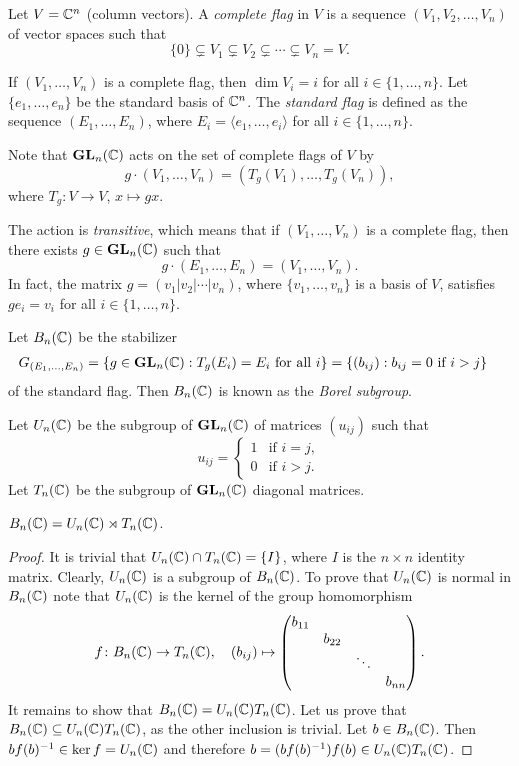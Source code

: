 \begin{definition}
    Let $V=\mathbb{C}^{n}$ (column vectors). A \emph{complete flag} in $V$ 
    is a sequence $(V_1,V_2,\dots,V_n)$ of vector spaces
    such that 
    \[
    \{0\}\subsetneq V_1\subsetneq V_2\subsetneq\cdots\subsetneq V_n=V.
    \]
\end{definition}

If $(V_1,\dots,V_n)$ is a complete flag, then $\dim V_i=i$ for all 
$i\in\{1,\dots,n\}$. 
Let $\{e_1,\dots,e_n\}$ be the standard basis of $\mathbb{C}^n$. 
The \emph{standard flag} is defined as the sequence $(E_1,\dots,E_n)$, where
$E_i=\langle e_1,\dots,e_i\rangle$ for all $i\in\{1,\dots,n\}$.  

Note that $\mathbf{GL}_n(\mathbb{C})$ acts on the set of complete flags of $V$ 
by 
\[
g\cdot (V_1,\dots,V_n)=(T_g(V_1),\dots,T_g(V_n)),
\]
where $T_g\colon V\to V$, $x\mapsto gx$. 

The action is \emph{transitive}, 
which means that if $(V_1,\dots,V_n)$ 
is a complete flag, then there exists 
$g\in\mathbf{GL}_n(\mathbb{C})$ such that 
\[
g\cdot (E_1,\dots,E_n)=(V_1,\dots,V_n).
\]
In fact, 
the matrix $g=(v_1|v_2|\cdots|v_n)$, where
$\{v_1,\dots,v_n\}$ is a basis of $V$, 
satisfies $ge_i=v_i$ for all $i\in\{1,\dots,n\}$. 

\label{Borel subgroup}
Let $B_n(\mathbb{C})$ be the stabilizer    
\begin{align*}
G_{(E_1,\dots,E_n)}
&=\{g\in\mathbf{GL}_n(\mathbb{C}):T_g(E_i)=E_i\text{ for all $i$}\}
=\{(b_{ij}):b_{ij}=0\text{ if $i>j$}\}
\end{align*}
of the standard flag. Then $B_n(\mathbb{C})$ is 
known as the \emph{Borel subgroup}. 

Let $U_n(\mathbb{C})$ be the subgroup of $\mathbf{GL}_n(\mathbb{C})$ 
of matrices $(u_{ij})$ such that 
\[
u_{ij}=\begin{cases}
1&\text{if $i=j$},\\
0&\text{if $i>j$}.\end{cases}
\]
Let $T_n(\mathbb{C})$ be the subgroup of $\mathbf{GL}_n(\mathbb{C})$ diagonal matrices. 

\begin{proposition}
    $B_n(\mathbb{C})=U_n(\mathbb{C})\rtimes T_n(\mathbb{C})$. 
\end{proposition}

\begin{proof}
    It is trivial that $U_n(\mathbb{C})\cap T_n(\mathbb{C})=\{I\}$, where $I$ is the 
    $n\times n$ identity matrix. Clearly, $U_n(\mathbb{C})$ is a subgroup of $B_n(\mathbb{C})$.
    To prove that 
    $U_n(\mathbb{C})$ is normal in $B_n(\mathbb{C})$ note that $U_n(\mathbb{C})$ is the kernel
    of the group homomorphism
    \[
    f\colon B_n(\mathbb{C})\to T_n(\mathbb{C}),\quad
    (b_{ij})\mapsto\begin{pmatrix}
        b_{11}\\
        &b_{22}\\
        &&\ddots\\
        &&&b_{nn}
    \end{pmatrix}.
    \]
    It remains to show that $B_n(\mathbb{C})=U_n(\mathbb{C})T_n(\mathbb{C})$.
    Let us prove that  $B_n(\mathbb{C})\subseteq U_n(\mathbb{C})T_n(\mathbb{C})$, as the other inclusion is trivial. 
    Let $b\in B_n(\mathbb{C})$. Then
    $bf(b)^{-1}\in \ker f=U_n(\mathbb{C})$ and therefore  
    $b=(bf(b)^{-1})f(b)\in U_n(\mathbb{C})T_n(\mathbb{C})$. 
\end{proof}

